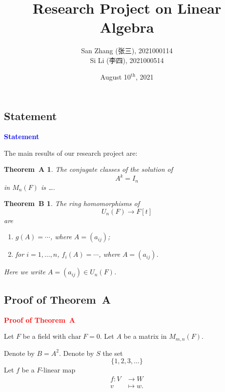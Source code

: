 \documentclass{beamer}
\newcommand{\ch}{\mathrm{char}\;}
\newcommand\lra{\longrightarrow}
\newcommand\lto{\longmapsto}
\newcommand{\fct}[4]{\begin{split}#1&\lra #2\\#3&\lto #4\end{split}}
\newtheorem{theoremA}[theorem]{Theorem~A}
\newtheorem{theoremB}[theorem]{Theorem~B}
\theoremstyle{remark}
\numberwithin{equation}{section}
\begin{document}
\title{Research Project on Linear Algebra}
\author[S. Zhang \& S. Li]{San Zhang (张三), 2021000114\\
Si Li (李四), 2021000514
}
\date{August 10$^\text{th}$, 2021}

\frame{\titlepage}

\begin{frame}
\section{Statement}
\begin{center}
\textcolor{blue}{ %
	\huge{ %
		\bfseries Statement %
	}
}
\end{center}

The main results of our research project are: 
\begin{theoremA}\label{thm:A}%
The conjugate classes of the solution of
	\[A^k=I_n\] %
in $M_n(F)$ is \dots. %
\end{theoremA}
\end{frame}


\begin{frame}
\begin{theoremB}\label{thm:B}%
The ring homomorphisms of
	\[U_n(F)\to F[t]\]
are
\begin{enumerate}
\item $g(A)=\cdots$, where $A=(a_{ij})$; %
\item for $i=1,\dots,n$, $f_i(A)=\cdots$, where $A=(a_{ij})$.
\end{enumerate}
Here we write $A=(a_{ij})\in U_n(F)$.
\end{theoremB}
\end{frame}


\begin{frame}
\section{Proof of Theorem~A}
\begin{center}
\textcolor{red}{\Large{\bfseries Proof of Theorem~A}}
\end{center}
Let $F$ be a field with $\ch F=0$.
Let $A$ be a matrix in $M_{m,n}(F)$.

Denote by $B=A^2$.
Denote by $S$ the set
	\[
		\{1,2,3,\dots\} %
	\]
Let $f$ be a $F$-linear map
	\[\fct{f:V}{W}{v}{w.}\]%

\end{frame}
\end{document}

